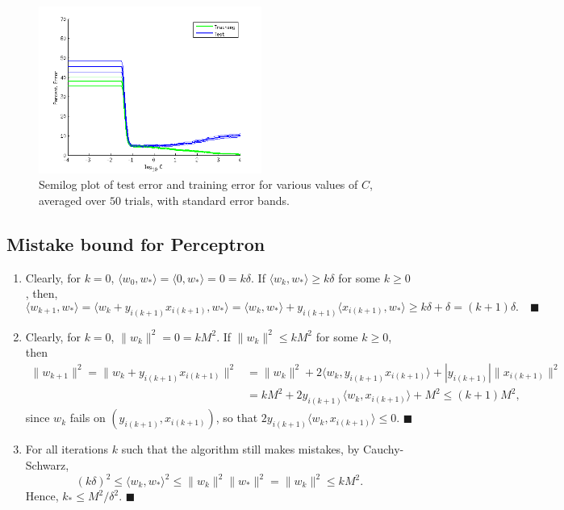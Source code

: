 \documentclass[11pt]{article}
\renewcommand{\qed}{\quad \ensuremath{\blacksquare}}
\begin{document}
\begin{figure}[h!]
\begin{center}
\includegraphics[width=0.65\textwidth]{4_2_3}
\end{center}
\vspace{-9mm}
\caption{Semilog plot of test error and training error for various values of
$C$, averaged over $50$ trials, with standard error bands.}
\label{fig:4.2.3}
\end{figure}

\subsection{Mistake bound for Perceptron}
\begin{enumerate}
\item Clearly, for $k = 0$,
$\langle w_0, w_* \rangle = \langle 0, w_* \rangle = 0 = k\delta$. If
$\langle w_k, w_* \rangle \geq k\delta$ for some $k \geq 0$, then,
\[\langle w_{k + 1}, w_* \rangle
    = \langle w_k + y_{i(k + 1)}x_{i(k + 1)}, w_* \rangle
    = \langle w_k, w_* \rangle + y_{i(k + 1)}\langle x_{i(k + 1)}, w_* \rangle
    \geq k\delta + \delta
    = (k + 1)\delta. \qed
\]
\item Clearly, for $k = 0$, $\|w_k\|^2 = 0 = kM^2$. If $\|w_k\|^2 \leq kM^2$
for some $k \geq 0$, then
\begin{align*}
\|w_{k + 1}\|^2
    = \|w_k + y_{i(k + 1)}x_{i(k + 1)}\|^2
 &  = \|w_k\|^2
        + 2\langle w_k, y_{i(k + 1)}x_{i(k + 1)} \rangle
        + |y_{i(k + 1)}|\|x_{i(k + 1)}\|^2  \\
 &  = kM^2 + 2y_{i(k + 1)}\langle w_k, x_{i(k + 1)} \rangle + M^2
    \leq (k + 1)M^2,
\end{align*}
since $w_k$ fails on $(y_{i(k + 1)},x_{i(k + 1)})$, so that
$2y_{i(k + 1)}\langle w_k, x_{i(k + 1)} \rangle \leq 0$. \qed
\item For all iterations $k$ such that the algorithm still makes mistakes, by
Cauchy-Schwarz,
\[(k\delta)^2
    \leq \langle w_k, w_* \rangle^2
    \leq \|w_k\|^2\|w_*\|^2
    = \|w_k\|^2
    \leq kM^2.
\]
Hence, $k_* \leq M^2/\delta^2$. \qed
\end{enumerate}
\end{document}
